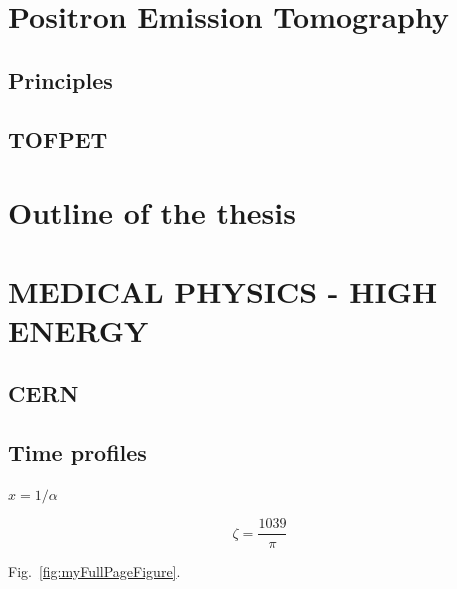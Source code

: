 \section{Positron Emission Tomography}
\subsection{Principles}


\subsection{TOFPET}

\section{Outline of the thesis}
\section{MEDICAL PHYSICS - HIGH ENERGY}
\subsection{CERN}
\subsection{Time profiles}



$x = 1/\alpha$ 

$$\zeta = \frac{1039}{\pi}$$

Fig.~\ref{fig:myFullPageFigure}.


\afterpage{\clearpage}


